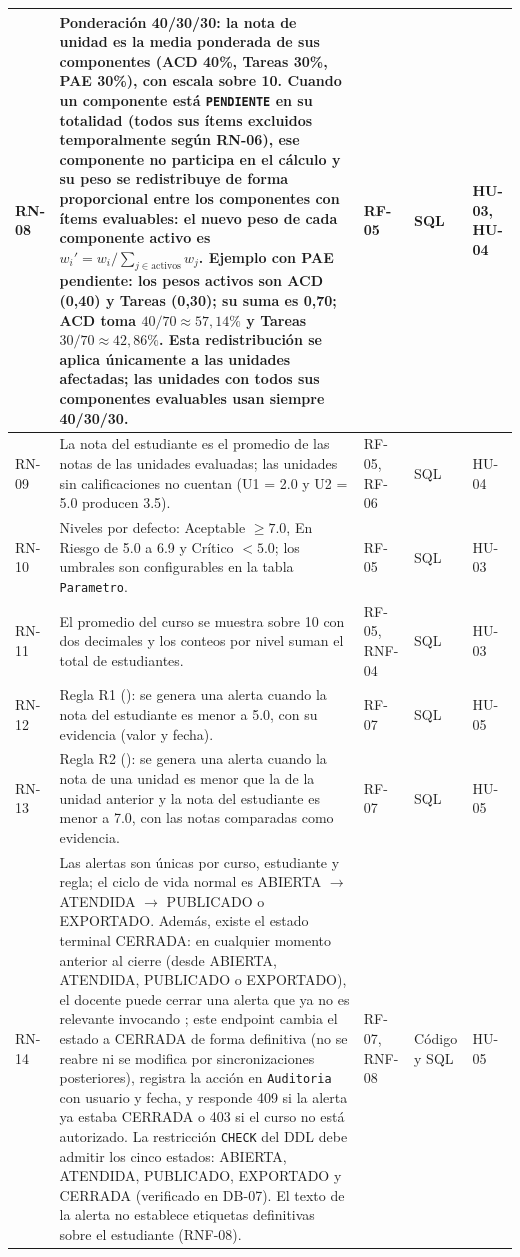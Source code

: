 \documentclass[11pt,a4paper]{article}
\begin{document}
\begin{longtable}{|R{1.3cm}|R{7.4cm}|R{1.9cm}|R{1.7cm}|R{1.7cm}|}
RN-08 & Ponderación 40/30/30: la nota de unidad es la media ponderada de sus componentes (ACD 40\%, Tareas 30\%, PAE 30\%), con escala sobre 10. Cuando un componente está \texttt{PENDIENTE} en su totalidad (todos sus ítems excluidos temporalmente según RN-06), ese componente no participa en el cálculo y su peso se redistribuye de forma proporcional entre los componentes con ítems evaluables: el nuevo peso de cada componente activo es $w_i' = w_i / \sum_{j \in \text{activos}} w_j$. Ejemplo con PAE pendiente: los pesos activos son ACD (0,40) y Tareas (0,30); su suma es 0,70; ACD toma $40/70 \approx 57{,}14\%$ y Tareas $30/70 \approx 42{,}86\%$. Esta redistribución se aplica únicamente a las unidades afectadas; las unidades con todos sus componentes evaluables usan siempre 40/30/30. & RF-05 & SQL & HU-03, HU-04\\ \hline
RN-09 & La nota del estudiante es el promedio de las notas de las unidades evaluadas; las unidades sin calificaciones no cuentan (U1 = 2.0 y U2 = 5.0 producen 3.5). & RF-05, RF-06 & SQL & HU-04\\ \hline
RN-10 & Niveles por defecto: Aceptable $\ge 7.0$, En Riesgo de 5.0 a 6.9 y Crítico $<5.0$; los umbrales son configurables en la tabla \texttt{Parametro}. & RF-05 & SQL & HU-03\\ \hline
RN-11 & El promedio del curso se muestra sobre 10 con dos decimales y los conteos por nivel suman el total de estudiantes. & RF-05, RNF-04 & SQL & HU-03\\ \hline
RN-12 & Regla R1 (): se genera una alerta cuando la nota del estudiante es menor a 5.0, con su evidencia (valor y fecha). & RF-07 & SQL & HU-05\\ \hline
RN-13 & Regla R2 (): se genera una alerta cuando la nota de una unidad es menor que la de la unidad anterior y la nota del estudiante es menor a 7.0, con las notas comparadas como evidencia. & RF-07 & SQL & HU-05\\ \hline
RN-14 & Las alertas son únicas por curso, estudiante y regla; el ciclo de vida normal es ABIERTA $\rightarrow$ ATENDIDA $\rightarrow$ PUBLICADO o EXPORTADO. Además, existe el estado terminal CERRADA: en cualquier momento anterior al cierre (desde ABIERTA, ATENDIDA, PUBLICADO o EXPORTADO), el docente puede cerrar una alerta que ya no es relevante invocando ; este endpoint cambia el estado a CERRADA de forma definitiva (no se reabre ni se modifica por sincronizaciones posteriores), registra la acción  en \texttt{Auditoria} con usuario y fecha, y responde 409 si la alerta ya estaba CERRADA o 403 si el curso no está autorizado. La restricción \texttt{CHECK} del DDL debe admitir los cinco estados: ABIERTA, ATENDIDA, PUBLICADO, EXPORTADO y CERRADA (verificado en DB-07). El texto de la alerta no establece etiquetas definitivas sobre el estudiante (RNF-08). & RF-07, RNF-08 & Código y SQL & HU-05\\ \hline

\end{longtable}
\end{document}
